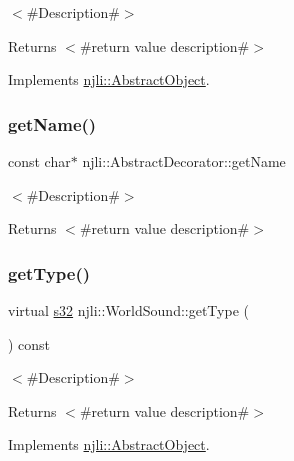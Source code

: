 $<$\#\+Description\#$>$

\begin{DoxyReturn}{Returns}
$<$\#return value description\#$>$ 
\end{DoxyReturn}


Implements \mbox{\hyperlink{classnjli_1_1_abstract_object_afdabb48c4bf763e297ffe810b433a863}{njli\+::\+Abstract\+Object}}.

\mbox{\label{classnjli_1_1_world_sound_ad41266885be835f3ee602311e20877a4}} 
\subsubsection{\texorpdfstring{get\+Name()}{getName()}}
{\footnotesize\ttfamily const char$\ast$ njli\+::\+Abstract\+Decorator\+::get\+Name}

$<$\#\+Description\#$>$

\begin{DoxyReturn}{Returns}
$<$\#return value description\#$>$ 
\end{DoxyReturn}
\mbox{\label{classnjli_1_1_world_sound_afa9fb24ca771bb477fdc673668c110c3}} 
\subsubsection{\texorpdfstring{get\+Type()}{getType()}}
{\footnotesize\ttfamily virtual \mbox{\hyperlink{_util_8h_aa62c75d314a0d1f37f79c4b73b2292e2}{s32}} njli\+::\+World\+Sound\+::get\+Type (\begin{DoxyParamCaption}{ }\end{DoxyParamCaption}) const\hspace{0.3cm}{\ttfamily [virtual]}}

$<$\#\+Description\#$>$

\begin{DoxyReturn}{Returns}
$<$\#return value description\#$>$ 
\end{DoxyReturn}


Implements \mbox{\hyperlink{classnjli_1_1_abstract_object_a08dcf202a47f0782813b8bc98c659e78}{njli\+::\+Abstract\+Object}}.

